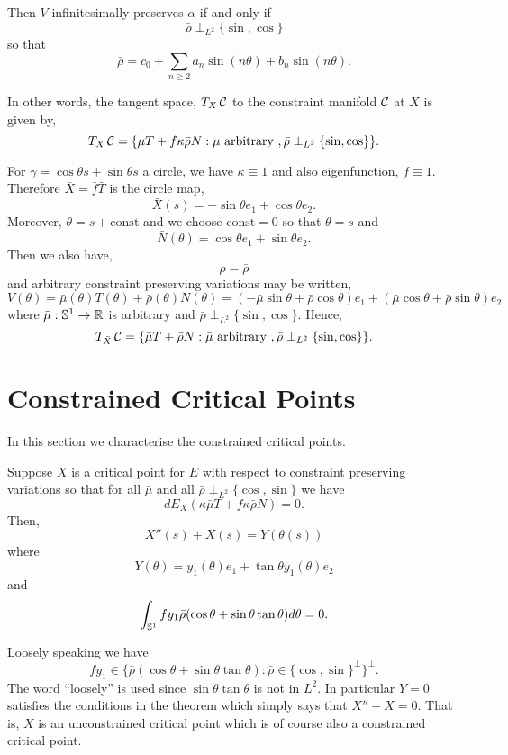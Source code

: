 \documentclass[12pt]{article}
\begin{document}
Then \(V\) infinitesimally preserves \(\alpha\) if and only if
\[
\bar{\rho} \perp_{L^2} \{\sin, \cos\}
\]
so that
\[
\bar{\rho} = c_0 + \sum_{n\geq 2} a_n \sin(n \theta) + b_n \sin(n \theta).
\]

In other words, the tangent space, \(T_X \operatorname{\mathcal{C}}\) to the constraint manifold \(\operatorname{\mathcal{C}}\) at \(X\) is given by,
\[
T_X \operatorname{\mathcal{C}} = \{\mu T + f\kappa\bar{\rho} N : \mu \text{ arbitrary }, \bar{\rho} \perp_{L^2} \{\sin, \cos\}\}.
\]

For \(\bar{\gamma} = \cos\theta s + \sin \theta s\) a circle, we have \(\bar{\kappa} \equiv 1\) and also eigenfunction, \(f \equiv 1\). Therefore \(\bar{X} = \bar{f} \bar{T}\) is the circle map,
\[
\bar{X}(s) = -\sin\theta e_1 + \cos\theta e_2.
\]
Moreover, \(\theta = s + \text{const}\) and we choose \(\text{const} = 0\) so that \(\theta = s\) and
\[
\bar{N}(\theta) = \cos\theta e_1 + \sin\theta e_2.
\]
Then we also have,
\[
\rho = \bar{\rho}
\]
and arbitrary constraint preserving variations may be written,
\[
V(\theta) = \bar{\mu}(\theta) T(\theta) + \bar{\rho}(\theta) N(\theta) = (- \bar{\mu}\sin\theta + \bar{\rho} \cos\theta) e_1 + (\bar{\mu}\cos\theta + \bar{\rho}\sin\theta) e_2
\]
where \(\bar{\mu} : \operatorname{\mathbb{S}^1} \to \operatorname{\mathbb{R}}\) is arbitrary and \(\bar{\rho} \perp_{L^2} \{\sin, \cos\}\). Hence,
\[
T_{\bar{X}} \operatorname{\mathcal{C}} = \{\bar{\mu} T + \bar{\rho} N : \bar{\mu} \text{ arbitrary }, \bar{\rho} \perp_{L^2} \{\sin, \cos\}\}.
\]

\section{Constrained Critical Points}

In this section we characterise the constrained critical points.

\begin{thm}
Suppose \(X\) is a critical point for \(E\) with respect to constraint preserving variations so that for all \(\bar{\mu}\) and all \(\bar{\rho} \perp_{L^2} \{\cos, \sin\}\) we have
\[
dE_X(\kappa\bar{\mu} T + f\kappa \bar{\rho} N) = 0.
\]
Then,
\[
X''(s) + X(s) = Y(\theta(s))
\]
where
\[
Y(\theta) = y_1(\theta) e_1 + \tan \theta y_1(\theta) e_2
\]
and
\[
\int_{\operatorname{\mathbb{S}^1}} f y_1 \bar{\rho}(\cos\theta + \sin\theta \tan\theta) d\theta = 0.
\]
\end{thm}

\begin{rem}
Loosely speaking we have
\[
fy_1 \in \{\bar{\rho} (\cos\theta + \sin\theta\tan\theta) : \bar{\rho} \in \{\cos, \sin\}^{\perp}\}^{\perp}.
\]
The word ``loosely'' is used since \(\sin\theta\tan\theta\) is not in \(L^2\). In particular \(Y = 0\) satisfies the conditions in the theorem which simply says that \(X'' + X = 0\). That is, \(X\) is an unconstrained critical point which is of course also a constrained critical point.
\end{rem}
\end{document}
